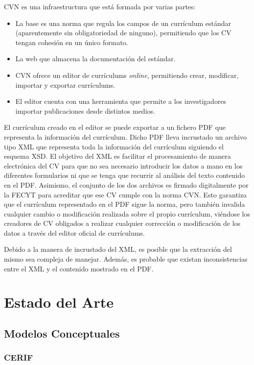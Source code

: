 \documentclass[12pt,a4paper]{article}
\begin{document}
CVN es una infraestructura que está formada por varias partes: 
\begin{itemize}
  \item La base es una norma que regula los campos de un currículum estándar (aparentemente sin obligatoriedad de ninguno), permitiendo que los CV tengan cohesión en un único formato. 
  \item La web que almacena la documentación del estándar. 
  \item CVN ofrece un editor de currículums \textit{online}, permitiendo crear, modificar, importar y exportar currículums. 
  \item El editor cuenta con una herramienta que permite a los investigadores importar publicaciones desde distintos medios.
\end{itemize}

El currículum creado en el editor se puede exportar a un fichero PDF que representa la información del currículum. Dicho PDF lleva incrustado un archivo tipo XML que representa toda la información del currículum siguiendo el esquema XSD. El objetivo del XML es facilitar el procesamiento de manera electrónica del CV para que no sea necesario introducir los datos a mano en los diferentes formularios ni que se tenga que recurrir al análisis del texto contenido en el PDF. Asimismo, el conjunto de los dos archivos es firmado digitalmente por la FECYT para acreditar que ese CV cumple con la norma CVN. Esto garantiza que el currículum representado en el PDF sigue la norma, pero también invalida cualquier cambio o modificación realizada sobre el propio currículum, viéndose los creadores de CV obligados a realizar cualquier corrección o modificación de los datos a través del editor oficial de currículums.

Debido a la manera de incrustado del XML, es posible que la extracción del mismo sea compleja de manejar. Además, es probable que existan inconsistencias entre el XML y el contenido mostrado en el PDF.

\section{Estado del Arte}
\subsection{Modelos Conceptuales}

\subsubsection{CERIF}
\end{document}
